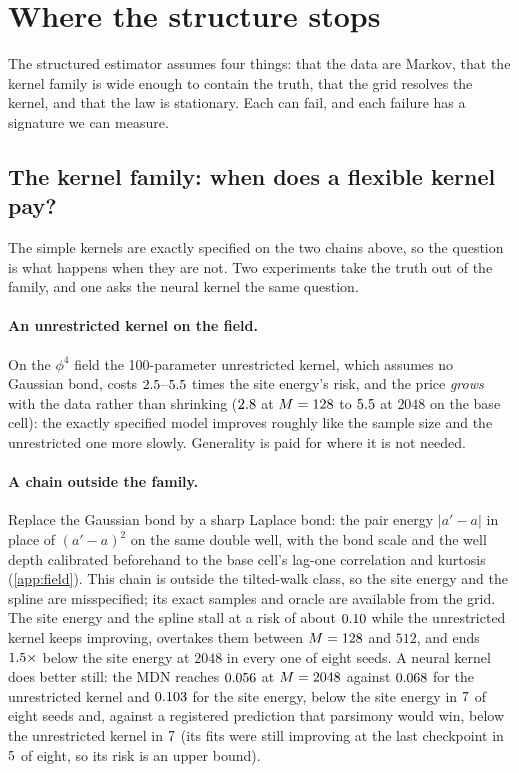 \section{Where the structure stops}
\label{sec:limits}

The structured estimator assumes four things: that the data are Markov, that the kernel family is wide enough to
contain the truth, that the grid resolves the kernel, and that the law is stationary. Each can fail, and each failure
has a signature we can measure.

\subsection{The kernel family: when does a flexible kernel pay?}
\label{sec:kernelclass}

The simple kernels are exactly specified on the two chains above, so the question is what happens when they are not.
Two experiments take the truth out of the family, and one asks the neural kernel the same question.

\paragraph{An unrestricted kernel on the field.}
On the $\phi^4$ field the 100-parameter unrestricted kernel, which assumes no Gaussian bond, costs
$2.5$--$5.5$ times the site energy's risk, and the price \emph{grows}
with the data rather than shrinking ($2.8$ at $M=128$ to $5.5$ at $2048$ on the
base cell): the exactly specified model improves roughly like the sample size and the unrestricted one more slowly.
Generality is paid for where it is not needed.

\paragraph{A chain outside the family.}
Replace the Gaussian bond by a sharp Laplace bond: the pair energy $|a'-a|$ in place of $(a'-a)^2$ on the same double well, with the bond
scale and the well depth calibrated beforehand to the base cell's lag-one correlation and kurtosis (\cref{app:field}).
This chain is outside the tilted-walk class, so the site energy and the spline
are misspecified; its exact samples and oracle are available from the grid. The site energy and the spline
stall at a risk of about $0.10$ while the unrestricted kernel keeps improving, overtakes them between
$M=128$ and $512$, and ends $1.5\times$ below the site energy at $2048$ in every one of
eight seeds. A neural kernel does better still: the MDN reaches $0.056$ at $M=2048$ against
$0.068$ for the unrestricted kernel and $0.103$ for the site energy, below the site energy
in $7$ of eight seeds and, against a registered prediction that parsimony would win, below
the unrestricted kernel in $7$ (its fits were still improving at the last checkpoint in
$5$ of eight, so its risk is an upper bound).

